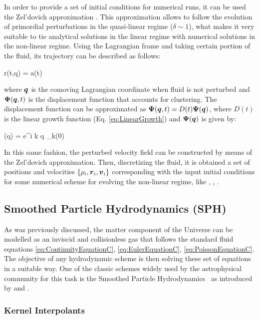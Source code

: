 \documentclass[a4,useAMS,usenatbib,usegraphicx,12pt]{article}
\begin{document}
In order to provide a set of initial conditions for numerical runs, it can be 
used the Zel'dovich approximation \citep{Zeldovich70}. This approximation allows
to follow the evolution of primordial perturbations in the quasi-linear regime 
($\delta \sim 1$), what makes it very suitable to tie analytical solutions in 
the linear regime with numerical solutions in the non-linear regime. Using the
Lagrangian frame and taking certain portion of the fluid, its trajectory can 
be described as follows:

{ \bds r(t,\bds q) = a(t) }

where $\boldsymbol{ q }$ is the comoving Lagrangian coordinate when fluid is not 
perturbed and $\boldsymbol{ \Psi }(\boldsymbol{ q }, t)$ is the displacement function that 
accounts for clustering. The displacement function can be approximated as 
$\boldsymbol{ \Psi }(\boldsymbol{ q }, t) = D(t)\boldsymbol{ \Psi }(\boldsymbol{ q })$, where $D(t)$ is the linear 
growth function (Eq. \ref{eq:LinearGrowth}) and $\boldsymbol{ \Psi }(\boldsymbol{ q })$ is given 
by:

{ \bds{\Psi}(\bds q) = \int {}e^{i \bds k \cdot \bds q}
\delta_{\bds k}(0) }

In this same fashion, the perturbed velocity field can be constructed by means
of the Zel'dovich approximation. Then, discretizing the fluid, it is obtained a 
set of positions and velocities $\{\rho_i,\boldsymbol{ r }_i, \boldsymbol{ v }_i\}$ corresponding 
with the input initial conditions for some numerical scheme for evolving the 
non-linear regime, like \SPH, \VPH, \AMR.


\subsection*{Smoothed Particle Hydrodynamics (SPH)}
As was previously discussed, the matter component of the Universe can be modelled
as an inviscid and collisionless gas that follows the standard fluid equations
\ref{eq:ContinuityEquationC}, \ref{eq:EulerEquationC}, \ref{eq:PoissonEquationC}.
The objective of any hydrodynamic scheme is then solving these set of equations
in a suitable way. One of the classic schemes widely used by the astrophysical 
community for this task is the Smoothed Particle Hydrodynamics \SPH\ as 
introduced by \citet{Lucy77} and \citet{Gingold77}.

\subsubsection*{Kernel Interpolants}
\end{document}
